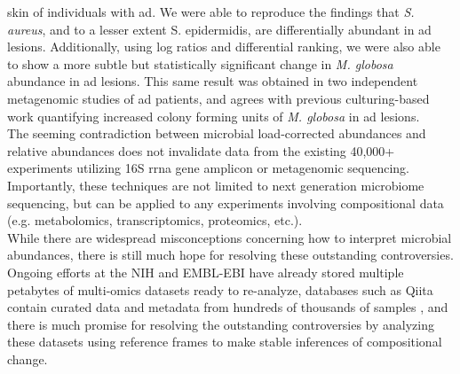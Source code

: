 skin of individuals with \gls{ad}. We were able to reproduce the findings that \textit{S. aureus}, and to a lesser extent S. epidermidis,
are differentially abundant in \gls{ad} lesions. Additionally, using log ratios and differential ranking, we were also able
to show a more subtle but statistically significant change in \textit{M. globosa} abundance in \gls{ad} lesions. This same result was
obtained in two independent metagenomic studies of \gls{ad} patients, and agrees with previous culturing-based work quantifying
increased colony forming units of \textit{M. globosa} in \gls{ad} lesions. \\[5 mm]
%
The seeming contradiction between microbial load-corrected abundances and relative abundances does not invalidate data
from the existing 40,000+ experiments utilizing 16S \gls{rrna} gene amplicon or metagenomic sequencing. Importantly, these
techniques are not limited to next generation microbiome sequencing, but can be applied to any experiments involving
compositional data (e.g. metabolomics, transcriptomics, proteomics, etc.). \\[5 mm]

While there are widespread misconceptions concerning how to interpret microbial abundances, there is still much
hope for resolving these outstanding controversies. Ongoing efforts at the NIH and EMBL-EBI have already stored
multiple petabytes of multi-omics datasets ready to re-analyze, databases such as Qiita contain curated data and
metadata from hundreds of thousands of samples \cite{Gonzalez2018-rv} , and there is much promise for resolving
the outstanding controversies by analyzing these datasets using reference frames to make stable inferences of
compositional change. \\[5 mm]
%
%
